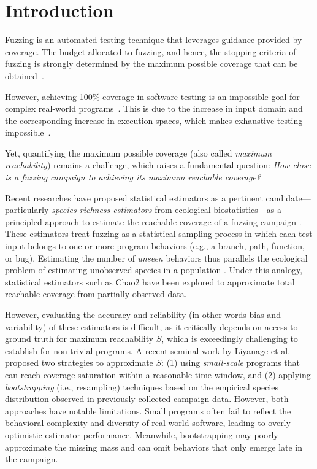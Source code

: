 \documentclass[conference]{IEEEtran}
\begin{document}
\section{Introduction}
Fuzzing is an automated testing technique that leverages guidance provided
by coverage. The budget allocated to fuzzing, and hence, the stopping criteria
of fuzzing is strongly determined by the maximum possible coverage that can
be obtained~\cite{fell2017review}.

However, achieving 100\% coverage in software testing is an impossible goal for
complex real-world programs~\cite{horgan1994achieving}.
This is due to the increase in input domain and the corresponding
increase in execution spaces, which makes exhaustive testing
impossible~\cite{knight1996exhaustive}.

Yet, quantifying the maximum possible coverage (also called \emph{maximum reachability})
remains a challenge, which raises a fundamental question:
\emph{How close is a fuzzing campaign to achieving its maximum reachable coverage?}

Recent researches have proposed statistical estimators as a pertinent candidate—particularly \emph{species richness estimators} from ecological biostatistics—as a principled approach to estimate the reachable coverage of a fuzzing campaign \cite{reachability_2023,stads}. These estimators treat fuzzing as a statistical sampling process in which each test input belongs to one or more program behaviors (e.g., a branch, path, function, or bug). Estimating the number of \emph{unseen} behaviors thus parallels the ecological problem of estimating unobserved species in a population \cite{chao2016species}. Under this analogy, statistical estimators such as Chao2 \cite{chao2017thirty} have been explored to approximate total reachable coverage from partially observed data.

However, evaluating the accuracy and reliability (in other words bias and variability) of these estimators is difficult, as it critically depends on access to ground truth for maximum reachability $S$, which is exceedingly challenging to establish for non-trivial programs. A recent seminal work by Liyanage et al.~\cite{reachability_2023} proposed two strategies to approximate $S$: (1) using \emph{small-scale} programs that can reach coverage saturation within a reasonable time window, and (2) applying \emph{bootstrapping} (i.e., resampling) techniques based on the empirical species distribution observed in previously collected campaign data. However, both approaches have notable limitations. Small programs often fail to reflect the behavioral complexity and diversity of real-world software, leading to overly optimistic estimator performance. Meanwhile, bootstrapping may poorly approximate the missing mass \cite{residual2021} and can omit behaviors that only emerge late in the campaign.
\end{document}
